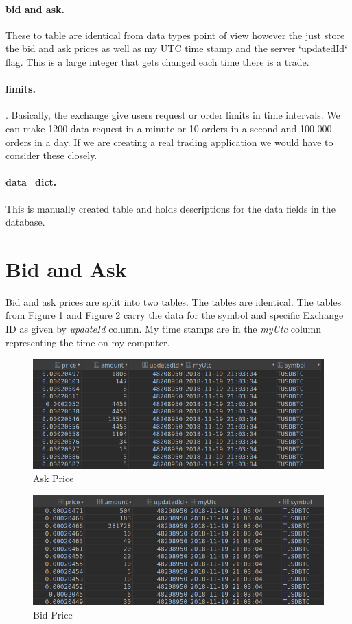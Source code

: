 \documentclass[12pt]{article}
\begin{document}
\paragraph*{bid and ask.} These to table are identical from data types point of view however the just store the bid and ask prices as well as my UTC time stamp and the server `updatedId` flag. This is a large integer that gets changed each time there is a trade.
\paragraph*{limits.}. Basically, the exchange give users request or order limits in time intervals. We can make 1200 data request in a minute or 10 orders in a second and 100 000 orders in a day. If we are creating a real trading application we would have to consider these closely.
\paragraph*{data\_dict.} This is manually created table and holds descriptions for the data fields in the database.

\section*{Bid and Ask}
Bid and ask prices are split into two tables. The tables are identical. The tables from Figure \ref{fig:ask} and Figure \ref{fig:bid} carry the data for the symbol and specific Exchange ID as given by \textit{updateId} column. My time stamps are in the \textit{myUtc} column representing the time on my computer.

\begin{figure}[h!]
	\centering
  \includegraphics[scale=0.3]{ask.png}
  \caption{Ask Price}
  \label{fig:ask}
\end{figure}

\begin{figure}[h!]
	\centering
  \includegraphics[scale=0.3]{bid.png}
  \caption{Bid Price}
  \label{fig:bid}
\end{figure}
\end{document}
